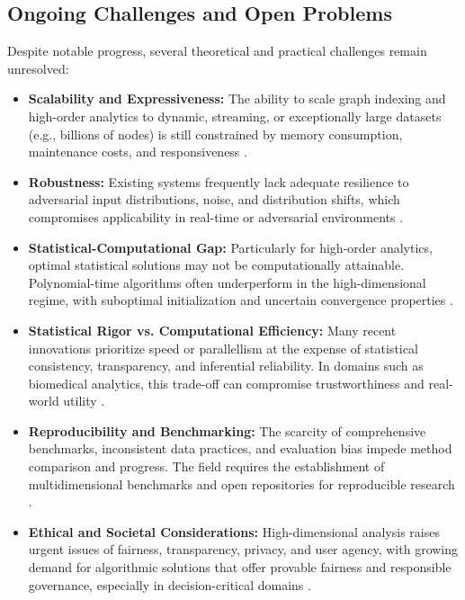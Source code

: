 \subsection{Ongoing Challenges and Open Problems}

Despite notable progress, several theoretical and practical challenges remain unresolved:

\begin{itemize}
    \item \textbf{Scalability and Expressiveness:} The ability to scale graph indexing and high-order analytics to dynamic, streaming, or exceptionally large datasets (e.g., billions of nodes) is still constrained by memory consumption, maintenance costs, and responsiveness \cite{ref104,ref107}.
    \item \textbf{Robustness:} Existing systems frequently lack adequate resilience to adversarial input distributions, noise, and distribution shifts, which compromises applicability in real-time or adversarial environments \cite{ref106}.
    \item \textbf{Statistical-Computational Gap:} Particularly for high-order analytics, optimal statistical solutions may not be computationally attainable. Polynomial-time algorithms often underperform in the high-dimensional regime, with suboptimal initialization and uncertain convergence properties \cite{ref110}.
    \item \textbf{Statistical Rigor vs. Computational Efficiency:} Many recent innovations prioritize speed or parallellism at the expense of statistical consistency, transparency, and inferential reliability. In domains such as biomedical analytics, this trade-off can compromise trustworthiness and real-world utility \cite{ref110,ref116}.
    \item \textbf{Reproducibility and Benchmarking:} The scarcity of comprehensive benchmarks, inconsistent data practices, and evaluation bias impede method comparison and progress. The field requires the establishment of multidimensional benchmarks and open repositories for reproducible research \cite{ref116}.
    \item \textbf{Ethical and Societal Considerations:} High-dimensional analysis raises urgent issues of fairness, transparency, privacy, and user agency, with growing demand for algorithmic solutions that offer provable fairness and responsible governance, especially in decision-critical domains \cite{ref117,ref118}.
\end{itemize}

